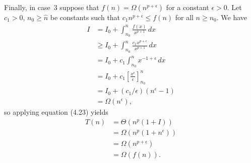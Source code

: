 Finally, in case~3 suppose that $f(n)=\Omega(n^{p+\epsilon})$ for a constant $\epsilon>0$.
Let $c_1>0$, $n_0\ge\widehat{n}$ be constants such that $c_1n^{p+\epsilon}\le f(n)$ for all $n\ge n_0$.
We have
\begin{align*}
    I &= I_0+\int_{n_0}^n\frac{f(x)}{x^{p+1}}\,dx \\[1mm]
    &\ge I_0+\int_{n_0}^n\frac{c_1x^{p+\epsilon}}{x^{p+1}}\,dx \\[1mm]
    &= I_0+c_1\int_{n_0}^nx^{-1+\epsilon}\,dx \\[1mm]
    &= I_0+c_1\left[\frac{x^\epsilon}{\epsilon}\right]_{n_0}^n \\[1mm]
    &= I_0+(c_1/\epsilon)(n^\epsilon-1) \\
    &= \Omega(n^\epsilon),
\end{align*}
so applying equation (4.23) yields
\begin{align*}
    T(n) &= \Theta(n^p(1+I)) \\
    &= \Omega(n^p(1+n^\epsilon)) \\
    &= \Omega(n^{p+\epsilon}) \\
    &= \Omega(f(n)).
\end{align*}

